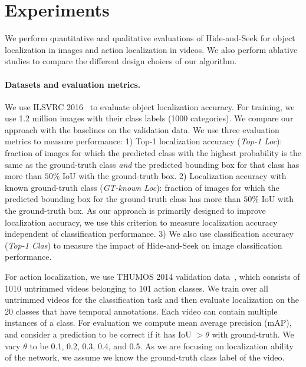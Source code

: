 \section{Experiments}\label{section:results}

We perform quantitative and qualitative evaluations of Hide-and-Seek for object localization in images and action localization in videos.  We also perform ablative studies to compare the different design choices of our algorithm.


\vspace{-10pt}
\paragraph{Datasets and evaluation metrics.} We use ILSVRC 2016~\cite{Russakovsky-IJCV2015} to evaluate object localization accuracy. For training, we use 1.2 million images with their class labels (1000 categories). We compare our approach with the baselines on the validation data. We use three evaluation metrics to measure performance: 1) Top-1 localization accuracy (\emph{Top-1 Loc}): fraction of images for which the predicted class with the highest probability is the same as the ground-truth class \emph{and} the predicted bounding box for that class has more than $50\%$ IoU with the ground-truth box. 2) Localization accuracy with known ground-truth class (\emph{GT-known Loc}): fraction of images for which the predicted bounding box for the ground-truth class has more than $50\%$ IoU with the ground-truth box.  As our approach is primarily designed to improve localization accuracy, we use this criterion to measure localization accuracy independent of classification performance. 3) We also use classification accuracy (\emph{Top-1 Clas}) to measure the impact of Hide-and-Seek on image classification performance.

For action localization, we use THUMOS 2014 validation data~\cite{jiang-14}, which consists of 1010 untrimmed videos belonging to 101 action classes. We train over all untrimmed videos for the classification task and then evaluate localization on the 20 classes that have temporal annotations. Each video can contain multiple instances of a class. For evaluation we compute mean average precision (mAP), and consider a prediction to be correct if it has IoU $> \theta$ with ground-truth. We vary $\theta$ to be 0.1, 0.2, 0.3, 0.4, and 0.5. As we are focusing on localization ability of the network, we assume we know the ground-truth class label of the video.


